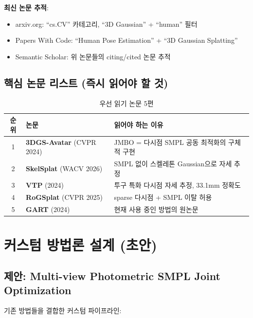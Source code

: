 \documentclass[11pt, a4paper]{report}
\begin{document}
\begin{searchbox}
\textbf{최신 논문 추적}:
\begin{itemize}[nosep]
  \item arxiv.org: ``cs.CV'' 카테고리, ``3D Gaussian'' + ``human'' 필터
  \item Papers With Code: ``Human Pose Estimation'' + ``3D Gaussian Splatting''
  \item Semantic Scholar: 위 논문들의 citing/cited 논문 추적
\end{itemize}
\end{searchbox}


\section{핵심 논문 리스트 (즉시 읽어야 할 것)}

\begin{table}[H]
\centering
\caption{우선 읽기 논문 5편}
\renewcommand{\arraystretch}{1.3}
\small
\begin{tabularx}{\textwidth}{clX}
\toprule
\textbf{순위} & \textbf{논문} & \textbf{읽어야 하는 이유} \\
\midrule
1 & \textbf{3DGS-Avatar} (CVPR 2024) & JMBO = 다시점 SMPL 공동 최적화의 구체적 구현 \\
2 & \textbf{SkelSplat} (WACV 2026) & SMPL 없이 스켈레톤 Gaussian으로 자세 추정 \\
3 & \textbf{VTP} (2024) & 투구 특화 다시점 자세 추정, 33.1mm 정확도 \\
4 & \textbf{RoGSplat} (CVPR 2025) & sparse 다시점 + SMPL 이탈 허용 \\
5 & \textbf{GART} (2024) & 현재 사용 중인 방법의 원논문 \\
\bottomrule
\end{tabularx}
\end{table}


\chapter{커스텀 방법론 설계 (초안)}

\section{제안: Multi-view Photometric SMPL Joint Optimization}

기존 방법들을 결합한 커스텀 파이프라인:
\end{document}
